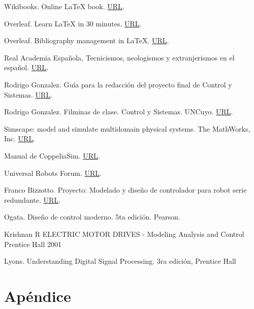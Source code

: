 \documentclass{article}
\begin{document}
\begin{sloppypar}
Wikibooks. Online \LaTeX{} book.
\href{https://en.wikibooks.org/wiki/LaTeX/}{URL}.

Overleaf. Learn LaTeX in 30 minutes.
\href{https://www.overleaf.com/learn/latex/Learn_LaTeX_in_30_minutes}{URL}.

Overleaf. Bibliography management in LaTeX.
\href{https://www.overleaf.com/learn/latex/Bibliography_management_in_LaTeX}{URL}.

Real Academia Española, Tecnicismos, neologismos y extranjerismos en el español.
\href{http://revistas.rae.es/bilrae/article/view/218/525}{URL}.

Rodrigo Gonzalez. Guía para la redacción del proyecto final de Control y Sistemas.
\href{https://es.overleaf.com/project/5ce7209e973f0d6ead24dcef}{URL}.

Rodrigo Gonzalez. Filminas de clase. Control y Sistemas. UNCuyo.
\href{https://github.com/rodralez/control}{URL}.

Simscape: model and simulate multidomain physical systems. The MathWorks, Inc.
\href{https://la.mathworks.com/products/simscape.html}{URL}.

Manual de CoppeliaSim.
\href{https://manual.coppeliarobotics.com/}{URL}.

Universal Robots Forum.
\href{https://forum.universal-robots.com/}{URL}.

Franco Bizzotto. Proyecto: Modelado y diseño de controlador para robot serie redundante.
\href{https://github.com/carloshernangarrido/control/blob/master/12_anteproyecto_proyecto-final/Bizzotto_Robot-serie.pdf}{URL}.

Ogata. Diseño de control moderno. 5ta edición. Pearson.

Krishnan R ELECTRIC MOTOR DRIVES - Modeling Analysis and Control Prentice Hall 2001

Lyons. Understanding Digital Signal Processing. 3ra edición, Prentice Hall



\printbibliography%


\section*{Apéndice}


\end{sloppypar}
\end{document}
